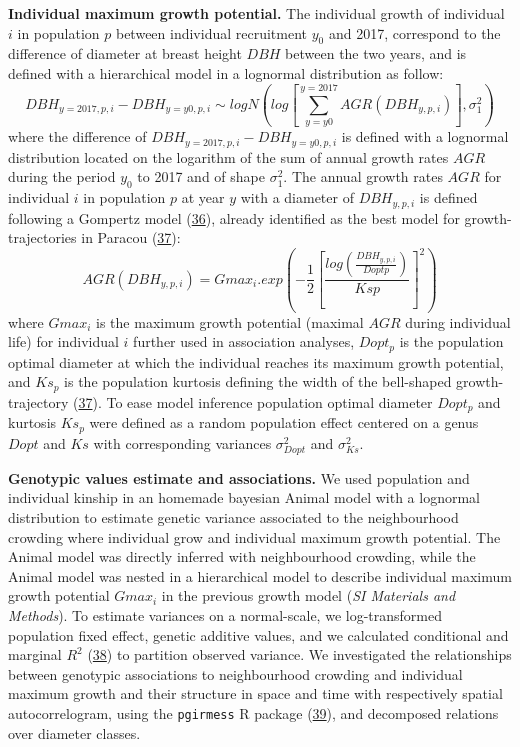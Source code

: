 \documentclass[
]{article}
\begin{document}
\textbf{Individual maximum growth potential.}
The individual growth of individual \(i\) in population \(p\) between individual recruitment \(y_0\) and 2017, correspond to the difference of diameter at breast height \(DBH\) between the two years, and is defined with a hierarchical model in a lognormal distribution as follow:
\[DBH_{y=2017,p,i} - DBH_{y=y0,p,i} \sim logN(log[\sum_{y=y0}^{y=2017}AGR(DBH_{y,p,i})], \sigma^2_1)\]
where the difference of \(DBH_{y=2017,p,i}-DBH_{y=y0,p,i}\) is defined with a lognormal distribution located on the logarithm of the sum of annual growth rates \(AGR\) during the period \(y_0\) to 2017 and of shape \(\sigma^2_1\).
The annual growth rates \(AGR\) for individual \(i\) in population \(p\) at year \(y\) with a diameter of \(DBH_{y,p,i}\) is defined following a Gompertz model (\protect\hyperlink{ref-Gompertz1825}{36}), already identified as the best model for growth-trajectories in Paracou (\protect\hyperlink{ref-Herault2011}{37}):
\[AGR(DBH_{y,p,i}) = Gmax_i.exp(-\frac12[\frac{log(\frac{DBH_{y,p,i}}{Doptp})}{Ksp}]^2)\]
where \(Gmax_i\) is the maximum growth potential (maximal \(AGR\) during individual life) for individual \(i\) further used in association analyses, \(Dopt_p\) is the population optimal diameter at which the individual reaches its maximum growth potential, and \(Ks_p\) is the population kurtosis defining the width of the bell-shaped growth-trajectory (\protect\hyperlink{ref-Herault2011}{37}).
To ease model inference population optimal diameter \(Dopt_p\) and kurtosis \(Ks_p\) were defined as a random population effect centered on a genus \(Dopt\) and \(Ks\) with corresponding variances \(\sigma^2_{Dopt}\) and \(\sigma^2_{Ks}\).

\textbf{Genotypic values estimate and associations.}
We used population and individual kinship in an homemade bayesian Animal model with a lognormal distribution to estimate genetic variance associated to the neighbourhood crowding where individual grow and individual maximum growth potential.
The Animal model was directly inferred with neighbourhood crowding, while the Animal model was nested in a hierarchical model to describe individual maximum growth potential \(Gmax_i\) in the previous growth model (\emph{SI Materials and Methods}).
To estimate variances on a normal-scale, we log-transformed population fixed effect, genetic additive values, and we calculated conditional and marginal \(R^2\) (\protect\hyperlink{ref-Nakagawa2013}{38}) to partition observed variance.
We investigated the relationships between genotypic associations to neighbourhood crowding and individual maximum growth and their structure in space and time with respectively spatial autocorrelogram, using the \texttt{pgirmess} R package (\protect\hyperlink{ref-Giraudoux2018}{39}), and decomposed relations over diameter classes.
\end{document}
